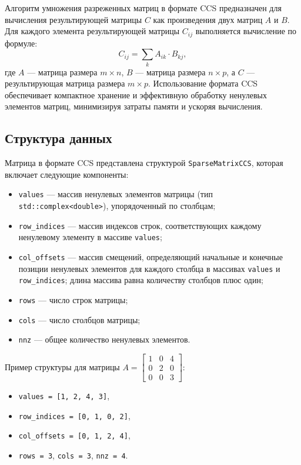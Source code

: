 \documentclass[12pt]{extarticle}
\begin{document}
\hspace*{1.25cm}Алгоритм умножения разреженных матриц в формате CCS предназначен для вычисления результирующей матрицы $C$ как произведения двух матриц $A$ и $B$. Для каждого элемента результирующей матрицы $C_{ij}$ выполняется вычисление по формуле:
\[
C_{ij} = \sum_{k} A_{ik} \cdot B_{kj},
\]
где $A$ — матрица размера $m \times n$, $B$ — матрица размера $n \times p$, а $C$ — результирующая матрица размера $m \times p$. Использование формата CCS обеспечивает компактное хранение и эффективную обработку ненулевых элементов матриц, минимизируя затраты памяти и ускоряя вычисления.

\subsection{Структура данных}

\hspace*{1.25cm}Матрица в формате CCS представлена структурой \texttt{SparseMatrixCCS}, которая включает следующие компоненты:
\begin{itemize}
    \item \texttt{values} — массив ненулевых элементов матрицы (тип \texttt{std::complex<double>}), упорядоченный по столбцам; \\[-0.9cm]
    \item \texttt{row\_indices} — массив индексов строк, соответствующих каждому ненулевому элементу в массиве \texttt{values}; \\[-0.9cm]
    \item \texttt{col\_offsets} — массив смещений, определяющий начальные и конечные позиции ненулевых элементов для каждого столбца в массивах \texttt{values} и \texttt{row\_indices}; длина массива равна количеству столбцов плюс один; \\[-0.9cm]
    \item \texttt{rows} — число строк матрицы; \\[-0.9cm]
    \item \texttt{cols} — число столбцов матрицы; \\[-0.9cm]
    \item \texttt{nnz} — общее количество ненулевых элементов.
\end{itemize}

Пример структуры для матрицы $A = \begin{bmatrix} 1 & 0 & 4 \\ 0 & 2 & 0 \\ 0 & 0 & 3 \end{bmatrix}$:
\begin{itemize}
    \item \texttt{values = [1, 2, 4, 3]}, \\[-0.9cm]
    \item \texttt{row\_indices = [0, 1, 0, 2]}, \\[-0.9cm]
    \item \texttt{col\_offsets = [0, 1, 2, 4]}, \\[-0.9cm]
    \item \texttt{rows = 3}, \texttt{cols = 3}, \texttt{nnz = 4}.
\end{itemize}
\end{document}
